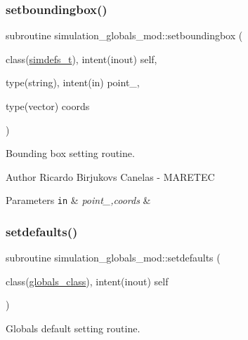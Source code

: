 \subsubsection{\texorpdfstring{setboundingbox()}{setboundingbox()}}
{\footnotesize\ttfamily subroutine simulation\+\_\+globals\+\_\+mod\+::setboundingbox (\begin{DoxyParamCaption}\item[{class(\hyperlink{structsimulation__globals__mod_1_1simdefs__t}{simdefs\+\_\+t}), intent(inout)}]{self,  }\item[{type(string), intent(in)}]{point\+\_\+,  }\item[{type(vector)}]{coords }\end{DoxyParamCaption})\hspace{0.3cm}{\ttfamily [private]}}



Bounding box setting routine. 

\begin{DoxyAuthor}{Author}
Ricardo Birjukovs Canelas -\/ M\+A\+R\+E\+T\+EC 
\end{DoxyAuthor}

\begin{DoxyParams}[1]{Parameters}
\mbox{\tt in}  & {\em point\+\_\+,coords} & \\
\hline
\end{DoxyParams}
\mbox{\label{namespacesimulation__globals__mod_ac2ac06271de377004c67b6ba2f3ed353}} 
\subsubsection{\texorpdfstring{setdefaults()}{setdefaults()}}
{\footnotesize\ttfamily subroutine simulation\+\_\+globals\+\_\+mod\+::setdefaults (\begin{DoxyParamCaption}\item[{class(\hyperlink{structsimulation__globals__mod_1_1globals__class}{globals\+\_\+class}), intent(inout)}]{self }\end{DoxyParamCaption})\hspace{0.3cm}{\ttfamily [private]}}



Globals default setting routine. 

